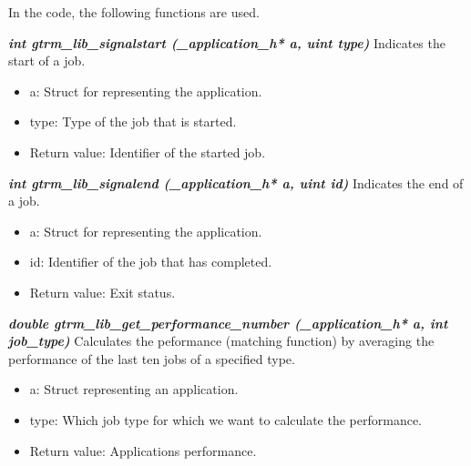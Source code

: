 \documentclass[nobiblatex]{LTHthesis}
\begin{document}
In the code, the following functions are used.
\begin{framed}
	\begin{flushleft}		
		\emph{\textbf{{int gtrm\_lib\_signalstart
      (\_application\_h* a, uint type)}}} \newline
				Indicates the start of a job.
				\begin{itemize}
				\item a: Struct for representing the application.
				\item type: Type of the job that is started.
				\item Return value: Identifier of the started job.
				\end{itemize}
	\end{flushleft}
\end{framed}


\begin{framed}
	\begin{flushleft}	
			\emph{\textbf{{int gtrm\_lib\_signalend
        (\_application\_h* a, uint id)}}} \newline
			Indicates the end of a job.
			\begin{itemize}
			\item a: Struct for representing the application.
			\item id: Identifier of the job that has completed.
			\item Return value: Exit status.
			\end{itemize}
	\end{flushleft}
\end{framed}

\begin{framed}
	\begin{flushleft}	
		\emph{\textbf{{double gtrm\_lib\_get\_performance\_number \newline
    (\_application\_h* a, int job\_type)}}} \newline
		Calculates the peformance (matching function) by averaging 
    the performance of the last ten jobs of a specified type.
		\begin{itemize}
		\item a: Struct representing an application.
		\item type: Which job type for which we want to calculate 
      the performance.
		\item Return value: Applications performance.
		\end{itemize}
	\end{flushleft}
\end{framed}
\end{document}
